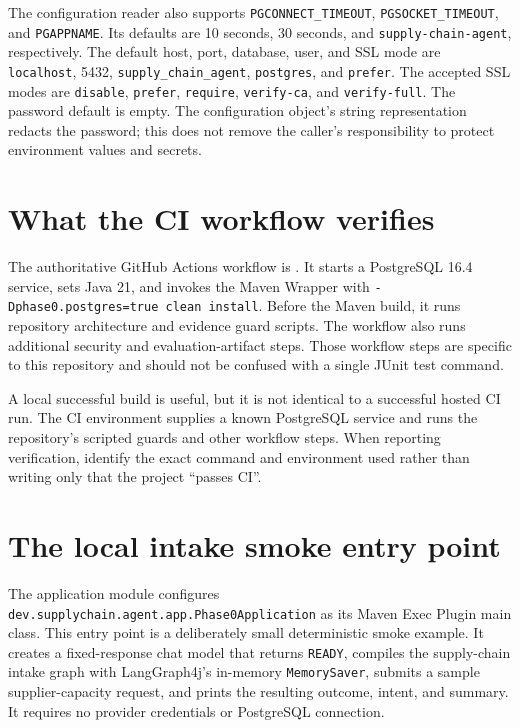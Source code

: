The configuration reader also supports \texttt{PGCONNECT\_TIMEOUT}, \texttt{PGSOCKET\_TIMEOUT}, and \texttt{PGAPPNAME}. Its defaults are 10 seconds, 30 seconds, and \texttt{supply-chain-agent}, respectively. The default host, port, database, user, and SSL mode are \texttt{localhost}, 5432, \texttt{supply\_chain\_agent}, \texttt{postgres}, and \texttt{prefer}. The accepted SSL modes are \texttt{disable}, \texttt{prefer}, \texttt{require}, \texttt{verify-ca}, and \texttt{verify-full}. The password default is empty. The configuration object's string representation redacts the password; this does not remove the caller's responsibility to protect environment values and secrets.

\section{What the CI workflow verifies}

The authoritative GitHub Actions workflow is . It starts a PostgreSQL 16.4 service, sets Java 21, and invokes the Maven Wrapper with \texttt{-Dphase0.postgres=true clean install}. Before the Maven build, it runs repository architecture and evidence guard scripts. The workflow also runs additional security and evaluation-artifact steps. Those workflow steps are specific to this repository and should not be confused with a single JUnit test command.

A local successful build is useful, but it is not identical to a successful hosted CI run. The CI environment supplies a known PostgreSQL service and runs the repository's scripted guards and other workflow steps. When reporting verification, identify the exact command and environment used rather than writing only that the project ``passes CI''.

\section{The local intake smoke entry point}

The application module configures \texttt{dev.supplychain.agent.app.Phase0Application} as its Maven Exec Plugin main class. This entry point is a deliberately small deterministic smoke example. It creates a fixed-response chat model that returns \texttt{READY}, compiles the supply-chain intake graph with LangGraph4j's in-memory \texttt{MemorySaver}, submits a sample supplier-capacity request, and prints the resulting outcome, intent, and summary. It requires no provider credentials or PostgreSQL connection.

